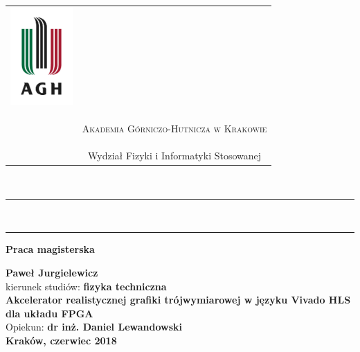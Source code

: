 \documentclass[a4paper, 12pt, twoside]{book}
\begin{document}
\begin{table}[H]
\resizebox{\textwidth}{!} {
\begin{tabular}{cc}
\multirow{2}{*}{\includegraphics[height=37.5mm]{img/agh.jpg}} & 
\phantom{tmp} \\ 
& \phantom{tmp} \\

& {
\begin{small}
\textsc{Akademia Górniczo-Hutnicza w Krakowie}
\end{small}} \\ 
& {\small{Wydział Fizyki i Informatyki Stosowanej}}
\end{tabular}
}
\end{table}
~\\ %
\rule{\textwidth}{3pt}\\
\rule[2ex]
\textwidth{1pt}\\
\vspace{7ex}
\begin{center}
{\bf\LARGE{Praca magisterska}}\\
\vspace{13ex}




{\bf\Large{Paweł Jurgielewicz}}\\
\vspace{3ex}
{ \small kierunek studiów:} {\bf\normalsize{fizyka techniczna}}\\
\vspace{10ex}
{\bf\large{
Akcelerator realistycznej grafiki trójwymiarowej w języku Vivado HLS dla układu FPGA
}}\\
\vspace{14ex}
{ \Large {Opiekun:}} {\bf\Large{dr inż. Daniel Lewandowski}}\\
\vspace{18ex}
\bf\large{Kraków, czerwiec 2018}
\end{center}
\newpage
\thispagestyle{empty}
\end{document}
